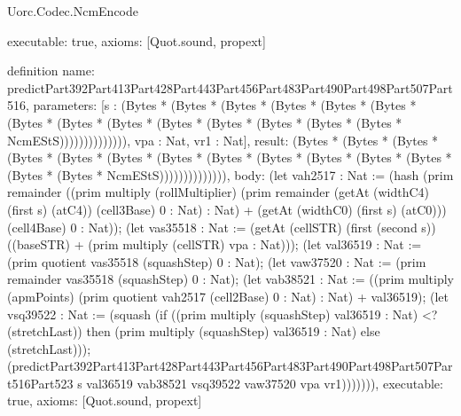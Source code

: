 \begin{lexlean}{Uorc.Codec.NcmEncode}
\begin{semanticmodule}
{  executable: true,
  axioms: [Quot.sound, propext]
}

definition{
  name: predictPart392Part413Part428Part443Part456Part483Part490Part498Part507Part516,
  parameters: [s : (Bytes * (Bytes * (Bytes * (Bytes * (Bytes * (Bytes * (Bytes * (Bytes * (Bytes * (Bytes * (Bytes * (Bytes * (Bytes * (Bytes * NcmEStS)))))))))))))), vpa : Nat, vr1 : Nat],
  result: (Bytes * (Bytes * (Bytes * (Bytes * (Bytes * (Bytes * (Bytes * (Bytes * (Bytes * (Bytes * (Bytes * (Bytes * (Bytes * (Bytes * NcmEStS)))))))))))))),
  body: (let vah2517 : Nat := (hash (prim remainder ((prim multiply (rollMultiplier) (prim remainder (getAt (widthC4) (first s) (atC4)) (cell3Base) 0 : Nat) : Nat) + (getAt (widthC0) (first s) (atC0))) (cell4Base) 0 : Nat)); (let vas35518 : Nat := (getAt (cellSTR) (first (second s)) ((baseSTR) + (prim multiply (cellSTR) vpa : Nat))); (let val36519 : Nat := (prim quotient vas35518 (squashStep) 0 : Nat); (let vaw37520 : Nat := (prim remainder vas35518 (squashStep) 0 : Nat); (let vab38521 : Nat := ((prim multiply (apmPoints) (prim quotient vah2517 (cell2Base) 0 : Nat) : Nat) + val36519); (let vsq39522 : Nat := (squash (if ((prim multiply (squashStep) val36519 : Nat) <? (stretchLast)) then (prim multiply (squashStep) val36519 : Nat) else (stretchLast))); (predictPart392Part413Part428Part443Part456Part483Part490Part498Part507Part516Part523 s val36519 vab38521 vsq39522 vaw37520 vpa vr1))))))),
  executable: true,
  axioms: [Quot.sound, propext]
}


\end{semanticmodule}
\end{lexlean}
